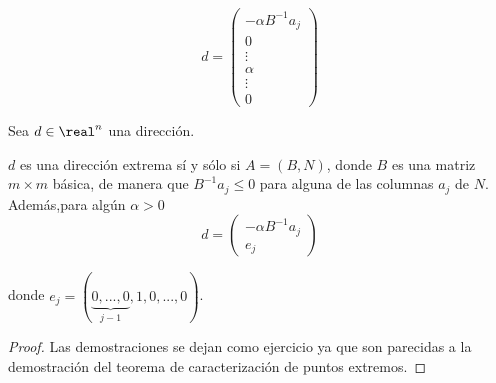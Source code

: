 \[d = \begin{pmatrix}-αB^{-1}a_j\\\hline 0\\\vdots\\ α\\ \vdots\\0\end{pmatrix} \]


\begin{theorem}
Sea $d\in\real^n$ una dirección.

$d$ es una dirección extrema sí y sólo si $A = (B,N)$, donde $B$ es una matriz $m\times m$ básica, de manera que $B^{-1}a_j\leq 0$ para alguna de las columnas $a_j$ de $N$. Además,para algún $α>0$  
\[d = \begin{pmatrix}-αB^{-1}a_j\\e_j\end{pmatrix}\]

donde $e_j = (\underbrace{0,...,0}_{j-1},1,0,...,0)$.
\end{theorem}

\begin{proof}
Las demostraciones se dejan como ejercicio ya que son parecidas a la demostración del teorema de caracterización de puntos extremos.
\end{proof}

